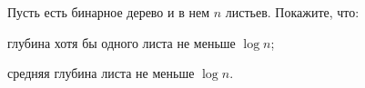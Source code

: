 Пусть есть бинарное дерево и в нем $n$ листьев. Покажите, что:
\begin{enumcyr}
    \item глубина хотя бы одного листа не меньше $\log n$;
    \item средняя глубина листа не меньше $\log n$.
\end{enumcyr}